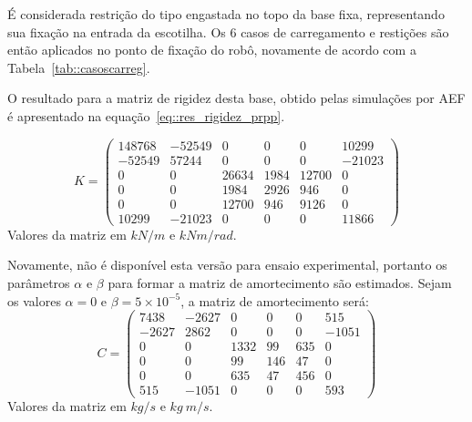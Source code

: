 É considerada restrição do tipo engastada no topo da base fixa, representando
sua fixação na entrada da escotilha. Os 6 casos de carregamento e restições são
então aplicados no ponto de fixação do robô, novamente de acordo com a
Tabela~\ref{tab::casoscarreg}.

O resultado para a matriz de rigidez desta base, obtido pelas simulações por
AEF é apresentado na equação~\ref{eq::res_rigidez_prpp}.

%
\begin{equation} \label{eq::res_rigidez_prpp}
	K = 
\begin{pmatrix}
148768	&	-52549	&	0	&	0	&	0	&	10299 \\
-52549	&	57244	&	0	&	0	&	0	&	-21023 \\
0	&	0	&	26634	&	1984	&	12700	&	0 \\
0	&	0	&	1984	&	2926	&	946	&	0 \\
0	&	0	&	12700	&	946	&	9126	&	0 \\
10299	&	-21023	&	0	&	0	&	0	&	11866
\end{pmatrix}
\end{equation}
%
Valores da matriz em $kN/m$ e $kNm/rad$.

Novamente, não é disponível esta versão para ensaio experimental, portanto os
parâmetros $\alpha$ e $\beta$ para formar a matriz de amortecimento são
estimados.
Sejam os valores $\alpha = 0$ e $\beta = 5 \times 10^{-5}$, a matriz de
amortecimento será:
%
\begin{equation} \label{eq::res_amortecimento_prpp}
	C = 
\begin{pmatrix}
7438	&	-2627	&	0	&	0	&	0	&	515 \\
-2627	&	2862	&	0	&	0	&	0	&	-1051 \\
0	&	0	&	1332	&	99	&	635	&	0 \\
0	&	0	&	99	&	146	&	47	&	0 \\
0	&	0	&	635	&	47	&	456	&	0 \\
515	&	-1051	&	0	&	0	&	0	&	593
\end{pmatrix}
\end{equation}
%
Valores da matriz em $kg/s$ e $kg~m/s$.

